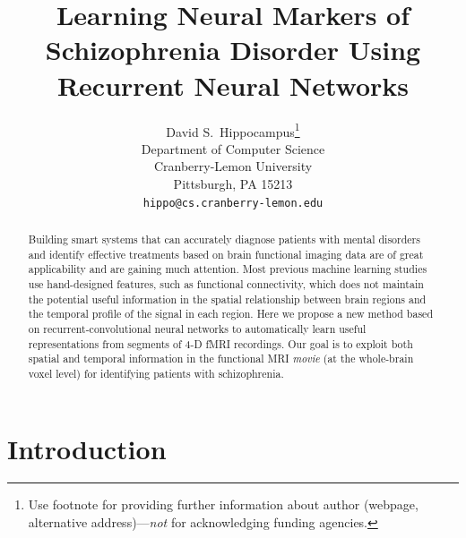 \documentclass{article}
\title{Learning Neural Markers of Schizophrenia Disorder Using Recurrent Neural Networks}
\author{
  David S.~Hippocampus\thanks{Use footnote for providing further
    information about author (webpage, alternative
    address)---\emph{not} for acknowledging funding agencies.} \\
  Department of Computer Science\\
  Cranberry-Lemon University\\
  Pittsburgh, PA 15213 \\
  \texttt{hippo@cs.cranberry-lemon.edu} \\
}
\begin{document}

\maketitle

\begin{abstract}

Building smart systems that can accurately diagnose patients with mental disorders and identify effective treatments based on brain functional imaging data are of great applicability and are gaining much attention. Most previous machine learning studies use hand-designed features, such as functional connectivity, which does not maintain the potential useful information in the spatial relationship between brain regions and the temporal profile of the signal in each region. Here we propose a new method based on recurrent-convolutional neural networks to automatically learn useful representations from segments of 4-D fMRI recordings. Our goal is to exploit both spatial and temporal information in the functional MRI \textit{movie} (at the whole-brain voxel level) for identifying patients with schizophrenia. %

\end{abstract}

\section{Introduction}
\end{document}
